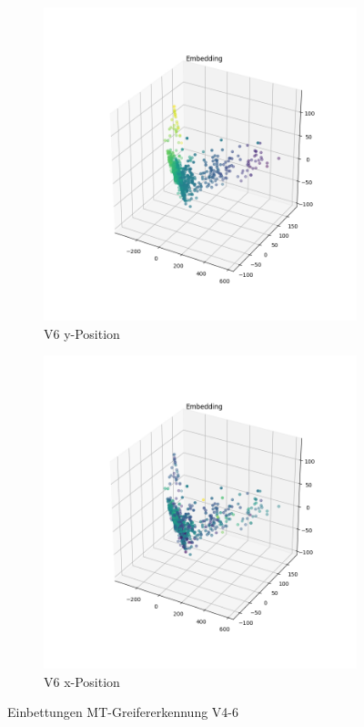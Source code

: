 \begin{figure}[h]
\begin{subfigure}[c]{0.49\textwidth}			
	\includegraphics[width=1\textwidth,center]{bilder/Hauptteil/MT_Grapple/EMB_alle/6_Embedding_y.png}
	\caption{V6 y-Position}
	\label{img:Einbettung6_y}	
\end{subfigure}
\centering
\begin{subfigure}[c]{0.49\textwidth}			
	\includegraphics[width=1\textwidth,center]{bilder/Hauptteil/MT_Grapple/EMB_alle/6_Embedding_x.png}
	\caption{V6 x-Position}
	\label{img:Einbettung6_x}		
\end{subfigure}

	\caption{Einbettungen MT-Greifererkennung V4-6}
	\label{img:Einbettungen4-6}
	\end{figure}
